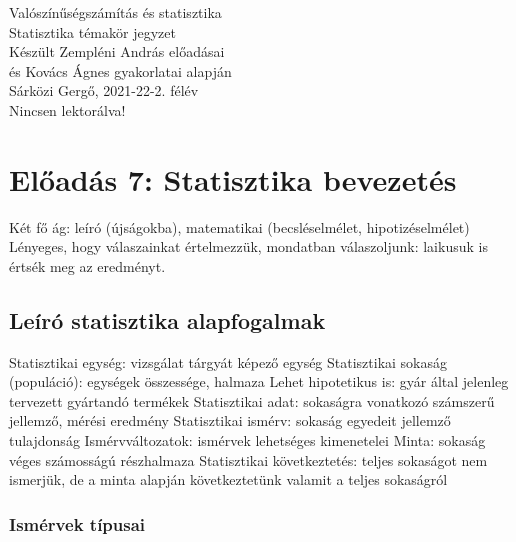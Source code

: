 \documentclass[12pt,a4paper]{article}
\begin{document}
\begin{center}
	\huge
	Valószínűségszámítás és statisztika\\
	\vspace{1mm}
	\LARGE
	Statisztika témakör jegyzet\\
	\vspace{5mm}
	\large
	Készült Zempléni András előadásai\\
	és Kovács Ágnes gyakorlatai alapján\\
	\vspace{5mm}
	Sárközi Gergő, 2021-22-2. félév\\
	Nincsen lektorálva!
\end{center}

\tableofcontents

\pagebreak

\section{Előadás 7: Statisztika bevezetés}

\begin{outline}
	\1 Két fő ág: leíró (újságokba), matematikai (becsléselmélet, hipotizéselmélet)
	\1 Lényeges, hogy válaszainkat értelmezzük, mondatban válaszoljunk: laikusuk is értsék meg az eredményt.
\end{outline}

\subsection{Leíró statisztika alapfogalmak}

\begin{outline}
	\1 Statisztikai egység: vizsgálat tárgyát képező egység
	\1 Statisztikai sokaság (populáció): egységek összessége, halmaza
		\2 Lehet hipotetikus is: gyár által jelenleg tervezett gyártandó termékek
	\1 Statisztikai adat: sokaságra vonatkozó számszerű jellemző, mérési eredmény
	\1 Statisztikai ismérv: sokaság egyedeit jellemző tulajdonság
	\1 Ismérvváltozatok: ismérvek lehetséges kimenetelei
	\1 Minta: sokaság véges számosságú részhalmaza
	\1 Statisztikai következtetés: teljes sokaságot nem ismerjük, de a minta alapján következtetünk valamit a teljes sokaságról
\end{outline}

\subsubsection{Ismérvek típusai}
\end{document}
